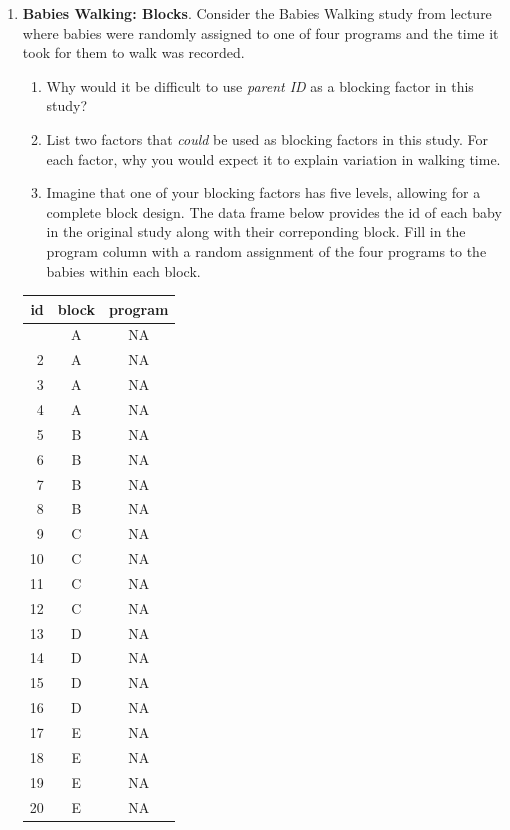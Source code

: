 \documentclass[
  letterpaper,
  DIV=11,
  numbers=noendperiod]{scrartcl}
\begin{document}
\newpage{}

\begin{enumerate}
\def\labelenumi{\arabic{enumi}.}
\setcounter{enumi}{3}
\item
  \textbf{Babies Walking: Blocks}. Consider the Babies Walking study
  from lecture where babies were randomly assigned to one of four
  programs and the time it took for them to walk was recorded.

  \begin{enumerate}
  \def\labelenumii{\alph{enumii}.}
  \item
    Why would it be difficult to use \emph{parent ID} as a blocking
    factor in this study?
  \item
    List two factors that \emph{could} be used as blocking factors in
    this study. For each factor, why you would expect it to explain
    variation in walking time.
  \item
    Imagine that one of your blocking factors has five levels, allowing
    for a complete block design. The data frame below provides the id of
    each baby in the original study along with their correponding block.
    Fill in the program column with a random assignment of the four
    programs to the babies within each block.
  \end{enumerate}

  \begin{table}
  \fontsize{12.0pt}{14.0pt}\selectfont
  \begin{tabular*}{\linewidth}{@{\extracolsep{\fill}}rcc}
  \toprule
  id & block & program \\ 
  \midrule\addlinespace[2.5pt]
  1 & A & NA \\ 
  2 & A & NA \\ 
  3 & A & NA \\ 
  4 & A & NA \\ 
  5 & B & NA \\ 
  6 & B & NA \\ 
  7 & B & NA \\ 
  8 & B & NA \\ 
  9 & C & NA \\ 
  10 & C & NA \\ 
  11 & C & NA \\ 
  12 & C & NA \\ 
  13 & D & NA \\ 
  14 & D & NA \\ 
  15 & D & NA \\ 
  16 & D & NA \\ 
  17 & E & NA \\ 
  18 & E & NA \\ 
  19 & E & NA \\ 
  20 & E & NA \\ 
  \bottomrule
  \end{tabular*}
  \end{table}
\end{enumerate}
\end{document}
